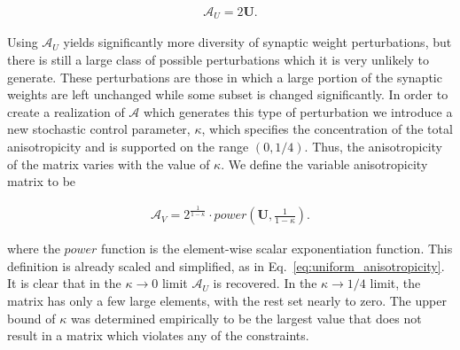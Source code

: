 \documentclass[11pt]{afthesis}
\begin{document}
	\begin{align}
	\boldsymbol{\mathcal{A}}_U =  2 \boldsymbol{U}.
	\label{eq:uniform_anisotropicity}
	\end{align}
	
	Using $\boldsymbol{\mathcal{A}}_U$ yields significantly more diversity of synaptic weight perturbations, but there is still a large class of possible perturbations which it is very unlikely to generate. These perturbations are those in which a large portion of the synaptic weights are left unchanged while some subset is changed significantly. In order to create a realization of $\boldsymbol{\mathcal{A}}$ which generates this type of perturbation we introduce a new stochastic control parameter, $\kappa$, which specifies the concentration of the total anisotropicity and is supported on the range $(0, 1/4)$. Thus, the anisotropicity of the matrix varies with the value of  $\kappa$. We define the variable anisotropicity matrix to be
	
	
	\begin{align}
	\boldsymbol{\mathcal{A}}_V =  2^{\frac{1}{1-\kappa}} \cdot power\left(\boldsymbol{U}, {\frac{1}{1-\kappa}}\right).
	\end{align}
	
	\noindent where the $power$ function is the element-wise scalar exponentiation function. This definition is already scaled and simplified, as in Eq.~\ref{eq:uniform_anisotropicity}. It is clear that in the $\kappa \rightarrow 0$ limit $\boldsymbol{\mathcal{A}}_U$ is recovered. In the $\kappa \rightarrow 1/4$ limit, the matrix has only a few large elements, with the rest set nearly to zero. The upper bound of $\kappa$ was determined empirically to be the largest value that does not result in a matrix which violates any of the constraints.
	
	
	

	
	
	
	
\end{document}
